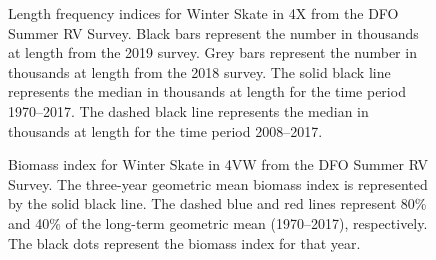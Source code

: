\documentclass[11pt]{book}
\begin{document}
\begin{figure}[htb]

{\centering {} 

}

\caption{Length frequency indices for Winter Skate in 4X from the DFO Summer RV Survey. Black bars represent the number in thousands at length from the 2019 survey. Grey bars represent the number in thousands at length from the 2018 survey. The solid black line represents the median in thousands at length for the time period 1970--2017. The dashed black line represents the median in thousands at length for the time period 2008--2017.}\label{fig:92-fig-winterskate-lengthfreq4X}
\end{figure}

\begin{figure}[htb]

{\centering {} 

}

\caption{Biomass index for Winter Skate in 4VW from the DFO Summer RV Survey. The three-year geometric mean biomass index is represented by the solid black line. The dashed blue and red lines represent 80\% and 40\% of the long-term geometric mean (1970--2017), respectively. The black dots represent the biomass index for that year.}\label{fig:93-fig-twinterskate-biomass4VW}
\end{figure}
\end{document}
